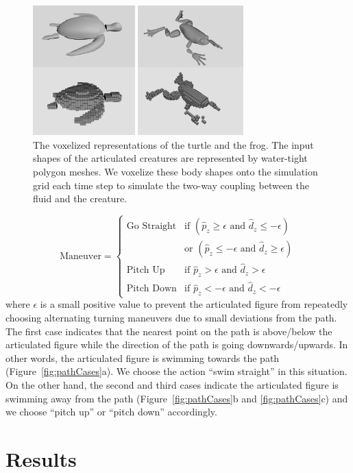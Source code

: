 \begin{figure}[!t]
\centering
\includegraphics[width=3.2in]{figures/grid1.eps}
\caption{The voxelized representations of the turtle and the frog. The input shapes of the articulated creatures are represented by water-tight polygon meshes. We voxelize these body shapes onto the simulation grid each time step to simulate the two-way coupling between the fluid and the creature.}
\label{fig:grid}
\end{figure}


\begin{displaymath}
\textrm{Maneuver}=\left\{\begin{array}{ll}
\textrm{Go Straight} & \textrm{if } (\hat{p}_z \geq \epsilon \textrm{ and }\hat{d}_z \leq -\epsilon)\\
                     & \textrm{or } ( \hat{p}_z \leq -\epsilon \textrm{ and } \hat{d}_z \geq \epsilon)\\
\textrm{Pitch Up} & \textrm{if } \hat{p}_z > \epsilon \textrm{ and } \hat{d}_z > \epsilon\\
\textrm{Pitch Down} & \textrm{if }\hat{p}_z < -\epsilon \textrm{ and } \hat{d}_z < -\epsilon
\end{array}\right.
\end{displaymath}
where $\epsilon$ is a small positive value to prevent the articulated
figure from repeatedly choosing alternating turning maneuvers due to small
deviations from the path. The first case indicates that the nearest point
on the path is above/below the articulated figure while the direction of
the path is going downwards/upwards. In other words, the articulated
figure is swimming towards the path (Figure~\ref{fig:pathCases}a). We
choose the action ``swim straight'' in this situation. On the other hand,
the second and third cases indicate the articulated figure is swimming
away from the path (Figure~\ref{fig:pathCases}b and \ref{fig:pathCases}c)
and we choose ``pitch up'' or ``pitch down'' accordingly.

\section{Results}


